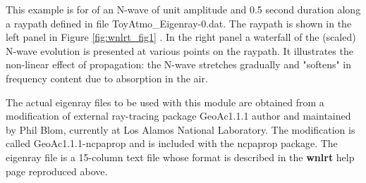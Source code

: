 This example is for of an N-wave of unit amplitude and 0.5 second duration along a raypath defined in file ToyAtmo\_Eigenray-0.dat. The raypath is shown in the left panel in Figure \ref{fig:wnlrt_fig1} . In the right panel a waterfall of the (scaled) N-wave evolution is presented at various points on the raypath. It illustrates the non-linear effect of propagation: the N-wave stretches gradually and "softens" in frequency content due to absorption in the air. 

The actual eigenray files to be used with this module are obtained from a modification of external ray-tracing package GeoAc1.1.1  author and maintained by Phil Blom, currently at Los Alamos National Laboratory. The modification is called GeoAc1.1.1-ncpaprop and is included with the ncpaprop package. The eigenray file is a 15-column text file whose format is described in the {\bf wnlrt} help page reproduced above.



